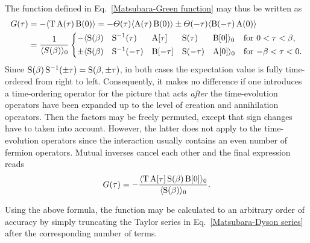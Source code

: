 The  function defined in Eq.~\ref{Matsubara-Green
function} may thus be written as
%
\begin{align*}
    G(\tau) &= -\langle\mathrm T \, \mathrm A(\tau) \, \mathrm B(0)\rangle =
    -\varTheta(\tau) \langle\mathrm A(\tau) \, \mathrm B(0)\rangle
    \pm \varTheta(-\tau) \langle\mathrm B(-\tau) \, \mathrm A(0)\rangle
    \\
    &= \frac 1 {\langle S(\beta)\rangle_0} \left \{
    \begin{aligned}
        - & \langle \mathrm S(\beta) &&
        \mathrm S^{-1}(\tau) && \mathrm A[\tau] && \mathrm S(\tau) &&
        \mathrm B[0] \rangle_0 && \text{for $0 < \tau < \beta$,} \\
        \pm & \langle \mathrm S(\beta) &&
        \mathrm S^{-1}(-\tau) && \mathrm B[-\tau] && \mathrm S(-\tau) &&
        \mathrm A[0] \rangle_0 && \text{for $-\beta < \tau < 0$.}
    \end{aligned}
    \right .
\end{align*}
%
Since $\mathrm S(\beta) \, \mathrm S^{-1}(\pm \tau) = \mathrm S(\beta, \pm \tau)$, in both
cases the expectation value is fully time-ordered from right to left.
Consequently, it makes no difference if one introduces a time-ordering operator
for the  picture that acts \emph{after} the time-evolution operators
have been expanded up to the level of creation and annihilation operators. Then
the factors may be freely permuted, except that sign changes have to taken into
account. However, the latter does not apply to the time-evolution operators
since the interaction usually contains an even number of fermion operators.
Mutual inverses cancel each other and the final expression reads
%
\begin{equation} \label{perturbation series}
    G(\tau) = -\frac{\langle\mathrm T \, \mathrm A[\tau] \, \mathrm S(\beta) \, \mathrm B[0]\rangle_0}
    {\langle\mathrm S(\beta)\rangle_0}.
\end{equation}

Using the above formula, the  function may be calculated
to an arbitrary order of accuracy by simply truncating the Taylor series in
Eq.~\ref{Matsubara-Dyson series} after the corresponding number of terms.


